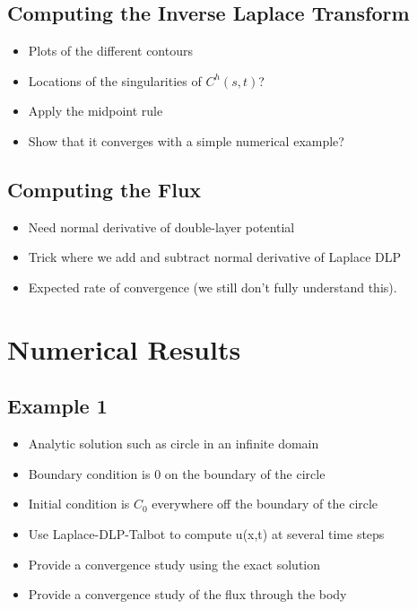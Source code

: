 \documentclass[preprint, 10pt]{elsarticle}
\begin{document}
\subsection{Computing the Inverse Laplace Transform} 
\label{sec:talbot}
\begin{itemize}
  \item Plots of the different contours
  \item Locations of the singularities of $C^h(s,t)$?
  \item Apply the midpoint rule
  \item Show that it converges with a simple numerical example?
\end{itemize}


\subsection{Computing the Flux}
\label{sec:flux}
\begin{itemize}
  \item Need normal derivative of double-layer potential
  \item Trick where we add and subtract normal derivative of Laplace DLP
  \item Expected rate of convergence (we still don't fully understand
    this).
\end{itemize}






\section{Numerical Results}


\subsection{Example 1}
\begin{itemize}
  \item Analytic solution such as circle in an infinite domain 
  \item Boundary condition is 0 on the boundary of the circle
  \item Initial condition is $C_0$ everywhere off the boundary of the
    circle
  \item Use Laplace-DLP-Talbot to compute u(x,t) at several time steps
  \item Provide a convergence study using the exact solution
  \item Provide a convergence study of the flux through the body
\end{itemize}
\end{document}

